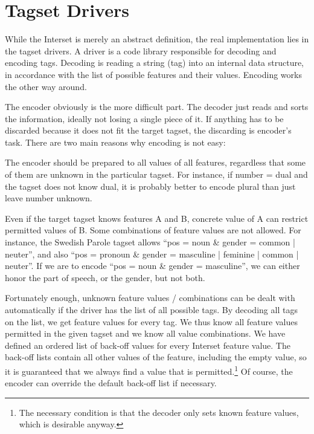 \documentclass[11pt]{article}
\begin{document}
\section{Tagset Drivers}
\label{sec:drivers}

While the Interset is merely an abstract definition, the real implementation lies in the tagset drivers. A driver is a code library responsible for decoding and encoding tags. Decoding is reading a string (tag) into an internal data structure, in accordance with the list of possible features and their values. Encoding works the other way around.

The encoder obviously is the more difficult part. The decoder just reads and sorts the information, ideally not losing a single piece of it. If anything has to be discarded because it does not fit the target tagset, the discarding is encoder’s task. There are two main reasons why encoding is not easy:

\begin{compactitem}
\item The encoder should be prepared to all values of all features, regardless that some of them are unknown in the particular tagset. For instance, if number = dual and the tagset does not know dual, it is probably better to encode plural than just leave number unknown.
\item Even if the target tagset knows features A and B, concrete value of A can restrict permitted values of B. Some combinations of feature values are not allowed. For instance, the Swedish Parole tagset allows “pos = noun \& gender = common | neuter”, and also “pos = pronoun \& gender = masculine | feminine | common | neuter”. If we are to encode “pos = noun \& gender = masculine”, we can either honor the part of speech, or the gender, but not both.
\end{compactitem}

Fortunately enough, unknown feature values / combinations can be dealt with automatically if the driver has the list of all possible tags. By decoding all tags on the list, we get feature values for every tag. We thus know all feature values permitted in the given tagset and we know all value combinations. We have defined an ordered list of back-off values for every Interset feature value. The back-off lists contain all other values of the feature, including the empty value, so it is guaranteed that we always find a value that is permitted.\footnote{The necessary condition is that the decoder only sets known feature values, which is desirable anyway.} Of course, the encoder can override the default back-off list if necessary.
\end{document}
